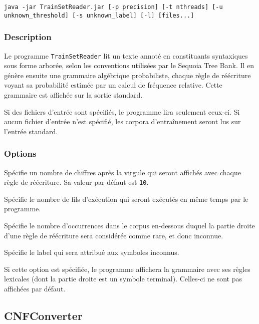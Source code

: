 \documentclass[12pt]{article}
\begin{document}
{\ttfamily
\begin{verbatim}
java -jar TrainSetReader.jar [-p precision] [-t nthreads] [-u
unknown_threshold] [-s unknown_label] [-l] [files...]
\end{verbatim}
}
 
\subsubsection{Description}
 
Le programme \texttt{TrainSetReader} lit un texte annoté en constituants
syntaxiques sous forme arborée, selon les conventions utilisées par le Sequoia Tree Bank. Il en
génère ensuite une grammaire algébrique probabiliste, chaque règle de réécriture
voyant sa probabilité estimée par un calcul de fréquence relative. Cette
grammaire est affichée sur la sortie standard.
 
Si des fichiers d'entrée sont spécifiés, le programme lira seulement ceux-ci. Si
aucun fichier d'entrée n'est spécifié, les corpora d'entraînement seront lus sur
l'entrée standard.

\subsubsection{Options}

\begin{description}[style=nextline]
\item[\texttt{-p, --precision precision}] Spécifie un nombre de chiffres après
la virgule qui seront affichés avec chaque règle de réécriture. Sa valeur par défaut est
\texttt{10}.
\item[\texttt{-t, --nthreads threads}] Spécifie le nombre de fils d'exécution
qui seront exécutés en même temps par le programme.
\item[\texttt{-u, --unknown-threshold unknown\_threshold}] Spécifie le nombre
d'occurrences dans le corpus en-dessous duquel la partie droite d'une règle de
réécriture sera considérée comme rare, et donc inconnue.
\item[\texttt{-s, --unknown-label unknown\_label}] Spécifie le label qui sera
attribué aux symboles inconnus.
\item[\texttt{-l, --lexical}] Si cette option est spécifiée, le programme
affichera la grammaire avec ses règles lexicales (dont la partie droite est un
symbole terminal). Celles-ci ne sont pas affichées par défaut.
\end{description}

\subsection{CNFConverter}
\end{document}
